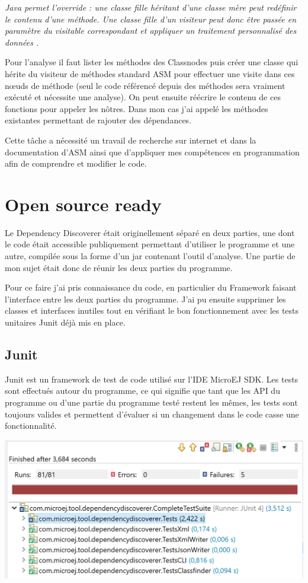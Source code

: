 \documentclass[french,a4paper,12pt]{report}
\begin{document}
\textit{Java permet l'override : une classe fille héritant d'une classe mère peut redéfinir le contenu d'une méthode. Une classe fille d'un visiteur peut donc être passée en paramètre du visitable correspondant et appliquer un traitement personnalisé des données .}


\bigskip

Pour l'analyse il faut lister les méthodes des Classnodes puis créer une classe qui hérite du visiteur de méthodes standard ASM pour effectuer une visite dans ces nœuds de méthode (seul le code référencé depuis des méthodes sera vraiment exécuté et nécessite une analyse). On peut ensuite réécrire le contenu de ces fonctions pour appeler les nôtres. Dans mon cas j'ai appelé les méthodes existantes permettant de rajouter des dépendances.   

Cette tâche a nécessité un travail de recherche sur internet et dans la documentation d’ASM ainsi que d’appliquer mes compétences en programmation afin de comprendre et modifier le code.
\section{Open source ready}

Le Dependency Discoverer était originellement séparé en deux parties, une dont le code était accessible publiquement permettant d'utiliser le programme et une autre, compilée sous la forme d'un jar contenant l'outil d'analyse. Une partie de mon sujet était donc de réunir les deux parties du programme.

Pour ce faire j'ai pris connaissance du code, en particulier du Framework faisant l'interface entre les deux parties du programme. J'ai pu ensuite supprimer les classes et interfaces inutiles tout en vérifiant le bon fonctionnement avec les tests unitaires Junit déjà mis en place.

\subsection{Junit}

Junit est un framework de test de code utilisé sur l’IDE MicroEJ SDK. Les tests sont effectués autour du programme, ce qui signifie que tant que les API du programme ou d'une partie du programme testé restent les mêmes, les tests sont toujours valides et permettent d’évaluer si un changement dans le code casse une fonctionnalité.

\begin{center}
 	\includegraphics[width=\textwidth]{ressources/images/junit.png}
\end{center}
\end{document}
